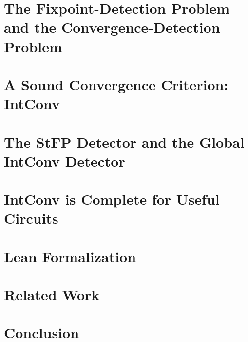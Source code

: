 \documentclass[acmsmall,screen,nonacm]{acmart}
\theoremstyle{compactdef}
\begin{document}
\section{The Fixpoint-Detection Problem and the Convergence-Detection Problem}\label{sec:fpd}


\section{A Sound Convergence Criterion: IntConv}\label{sec:intfp}


\section{The StFP Detector and the Global IntConv Detector}\label{sec:detector}


\section{IntConv is Complete for Useful Circuits}\label{sec:useful}


\section{Lean Formalization}\label{sec:formalization}


\section{Related Work}\label{sec:related}


\section{Conclusion}\label{sec:conclusion}







%
\end{document}
